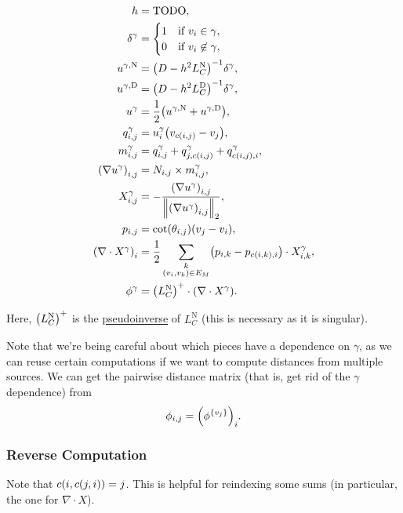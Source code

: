\begin{align*}
	h &= \text{TODO}, \\
	\delta^\gamma &= \begin{cases}
		1 & \text{if \(v_i \in \gamma\)}, \\
		0 & \text{if \(v_i \not\in \gamma\)},
	\end{cases} \\
	u^{\gamma, \text{N}} &= \pof{D - h^2L_C^{\text{N}}}^{-1}\delta^\gamma, \\
	u^{\gamma, \text{D}} &= \pof{D - h^2L_C^{\text{D}}}^{-1}\delta^\gamma, \\
	u^\gamma &= \frac{1}{2}\pof{u^{\gamma, \text{N}} + u^{\gamma, \text{D}}}, \\
	q^\gamma_{i, j} &= u^\gamma_i\pof{v_{c\pof{i, j}} - v_j}, \\
	m^\gamma_{i, j} &= q^\gamma_{i, j} + q^\gamma_{j, c\pof{i, j}} + q^\gamma_{c\pof{i, j}, i}, \\
	\pof{\nabla u^\gamma}_{i, j} &= N_{i, j} \times m^\gamma_{i, j}, \\
	X^\gamma_{i, j} &= -\frac{\pof{\nabla u^\gamma}_{i, j}}{\norm{\pof{\nabla u^\gamma}_{i, j}}_2}, \\
	p_{i, j} &= \cot\pof{\theta_{i, j}}\pof{v_j - v_i}, \\
	\pof{\nabla \cdot X^\gamma}_i &= \frac{1}{2}\sum_{\substack{k \\ \pof{v_i, v_k} \in E_M}}\pof{p_{i, k} - p_{c\pof{i, k}, i}} \cdot X^\gamma_{i, k}, \\
	\phi^\gamma &= \pof{L_C^{\text{N}}}^+ \cdot \pof{\nabla \cdot X^\gamma}.
\end{align*}

Here, \(\pof{L_C^{\text{N}}}^+\) is the \href{https://en.wikipedia.org/wiki/Moore%E2%80%93Penrose_inverse}{pseudoinverse} of \(L_C^{\text{N}}\) (this is necessary as it is singular).

Note that we're being careful about which pieces have a dependence on \(\gamma\), as we can reuse certain computations if we want to compute distances from multiple sources. We can get the pairwise distance matrix (that is, get rid of the \(\gamma\) dependence) from \[\phi_{i, j} = \pof{\phi^{\cof{v_j}}}_i.\]

\subsubsection{Reverse Computation}

Note that \(c\pof{i, c\pof{j, i}} = j\). This is helpful for reindexing some sums (in particular, the one for \(\nabla \cdot X\)).

